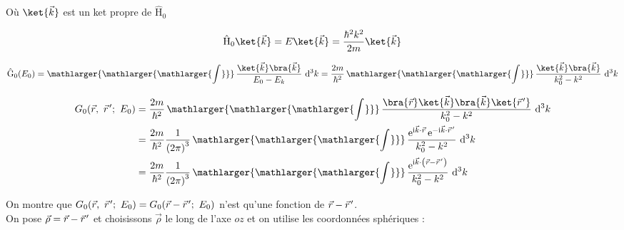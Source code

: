 \documentclass[12pt,a4paper,oneside,french]{book}
\renewcommand{\i}{\mathrm{i}}
\newcommand{\e}{\mathrm{e}}
\newcommand{\opr}[1]{\mathrm{\hat{#1}}}
\newcommand{\diff}{\mathrm{d}}
\newcommand{\pvec}[1]{\vec{#1} \mkern2mu \vphantom{#1}}
\newcommand{\Bigint}[2]{\mathop{\mathlarger{\mathlarger{\mathlarger{\int_{#1}^{#2}}}}}}
\theoremstyle{definition}
\theoremstyle{definition}
\theoremstyle{definition}
\theoremstyle{remark}
\theoremstyle{definition}
\begin{document}
    Où $\ket{\vec{k}}$ est un ket propre de ${\opr{H}}_{0}$
    
    \begin{equation*}
        {\opr{H}}_{0} \ket{\vec{k}} = E \ket{\vec{k}} = \frac{{\hbar}^{2} {k}^{2}}{2m} \ket{\vec{k}}
    \end{equation*}
    
    \begin{equation*}
        \opr{G}_{0}({E}_{0}) = \Bigint{}{} \frac{\ket{\vec{k}} \bra{\vec{k}}}{{E}_{0} - {E}_{k}} \ {\diff}^{3} k = \frac{2m}{{\hbar}^{2}} \Bigint{}{} \frac{\ket{\vec{k}} \bra{\vec{k}}}{{k}_{0}^{2} - {k}^{2}} \ {\diff}^{3} k
    \end{equation*}
    
    \begin{equation*}
    \begin{split}
        {G}_{0}(\vec{r}, \ \pvec{r}'; \ {E}_{0}) 
            &= \frac{2m}{{\hbar}^{2}} \Bigint{}{} \frac{\bra{\vec{r}} \ket{\vec{k}} \bra{\vec{k}} \ket{\pvec{r}'}}{{k}_{0}^{2} - {k}^{2}} \ {\diff}^{3} k \\
            &= \frac{2m}{{\hbar}^{2}} \frac{1}{{(2\pi)}^{3}} \Bigint{}{} \frac{{\e}^{\i \vec{k} \cdot \vec{r}} \, {\e}^{-\i \vec{k} \cdot \pvec{r}'}}{{k}_{0}^{2} - {k}^{2}} \ {\diff}^{3} k \\
            &= \frac{2m}{{\hbar}^{2}} \frac{1}{{(2\pi)}^{3}} \Bigint{}{} \frac{{\e}^{\i \vec{k} \cdot \left(\vec{r} - \pvec{r}'\right)}}{{k}_{0}^{2} - {k}^{2}} \ {\diff}^{3} k
    \end{split}
    \end{equation*}
    
    On montre que ${G}_{0}(\vec{r}, \ \pvec{r}'; \ {E}_{0}) = {G}_{0}(\vec{r} - \pvec{r}'; \ {E}_{0})$ n'est qu'une fonction de $\vec{r} - \pvec{r}'$. \\
    
    On pose $\vec{\rho} = \vec{r} - \pvec{r}'$ et choisissons $\vec{\rho}$ le long de l'axe $oz$ et on utilise les coordonnées sphériques :
    
\end{document}
